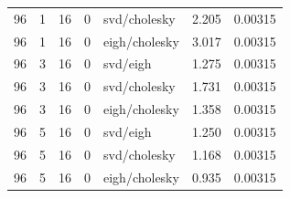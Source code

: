 \begin{tabular}{rrrrlrr}
96 & 1 & 16 & 0 & svd/cholesky & 2.205 & 0.00315 \\
96 & 1 & 16 & 0 & eigh/cholesky & 3.017 & 0.00315 \\
96 & 3 & 16 & 0 & svd/eigh & 1.275 & 0.00315 \\
96 & 3 & 16 & 0 & svd/cholesky & 1.731 & 0.00315 \\
96 & 3 & 16 & 0 & eigh/cholesky & 1.358 & 0.00315 \\
96 & 5 & 16 & 0 & svd/eigh & 1.250 & 0.00315 \\
96 & 5 & 16 & 0 & svd/cholesky & 1.168 & 0.00315 \\
96 & 5 & 16 & 0 & eigh/cholesky & 0.935 & 0.00315 \\
\hline
\end{tabular}
